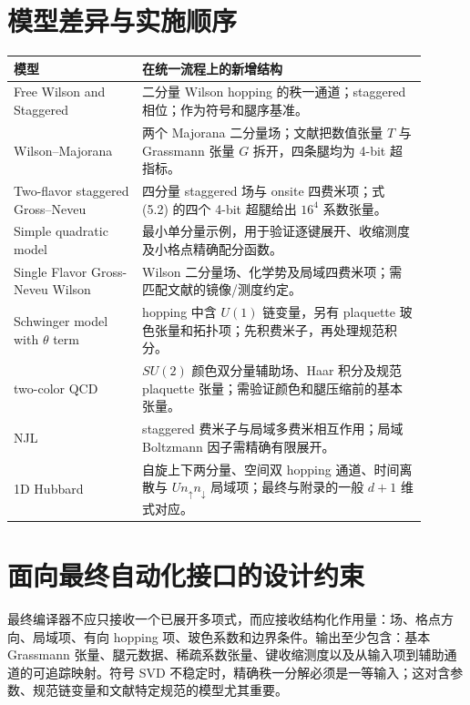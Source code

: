 \documentclass[UTF8,11pt]{ctexart}
\begin{document}
\section{模型差异与实施顺序}
\begin{center}
\begin{tabular}{p{0.28\linewidth}p{0.62\linewidth}}
\toprule
模型 & 在统一流程上的新增结构 \\
\midrule
Free Wilson and Staggered & 二分量 Wilson hopping 的秩一通道；staggered 相位；作为符号和腿序基准。\\
Wilson--Majorana & 两个 Majorana 二分量场；文献把数值张量 $T$ 与 Grassmann 张量 $G$ 拆开，四条腿均为 4-bit 超指标。\\
Two-flavor staggered Gross--Neveu & 四分量 staggered 场与 onsite 四费米项；式 (5.2) 的四个 4-bit 超腿给出 $16^4$ 系数张量。\\
Simple quadratic model & 最小单分量示例，用于验证逐键展开、收缩测度及小格点精确配分函数。\\
Single Flavor Gross-Neveu Wilson & Wilson 二分量场、化学势及局域四费米项；需匹配文献的镜像/测度约定。\\
Schwinger model with $\theta$ term & hopping 中含 $U(1)$ 链变量，另有 plaquette 玻色张量和拓扑项；先积费米子，再处理规范积分。\\
two-color QCD & $SU(2)$ 颜色双分量辅助场、Haar 积分及规范 plaquette 张量；需验证颜色和腿压缩前的基本张量。\\
NJL & staggered 费米子与局域多费米相互作用；局域 Boltzmann 因子需精确有限展开。\\
1D Hubbard & 自旋上下两分量、空间双 hopping 通道、时间离散与 $U n_\uparrow n_\downarrow$ 局域项；最终与附录的一般 $d+1$ 维式对应。\\
\bottomrule
\end{tabular}
\end{center}

\section{面向最终自动化接口的设计约束}
最终编译器不应只接收一个已展开多项式，而应接收结构化作用量：场、格点方向、局域项、有向 hopping 项、玻色系数和边界条件。输出至少包含：基本 Grassmann 张量、腿元数据、稀疏系数张量、键收缩测度以及从输入项到辅助通道的可追踪映射。符号 SVD 不稳定时，精确秩一分解必须是一等输入；这对含参数、规范链变量和文献特定规范的模型尤其重要。
\end{document}
